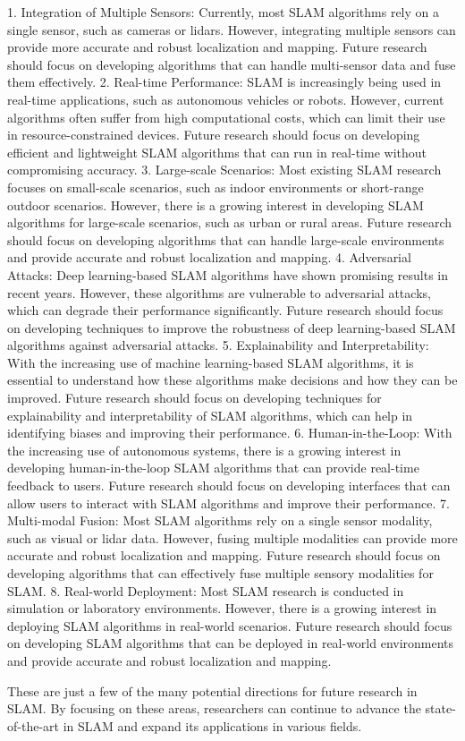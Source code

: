 \documentclass[conference]{IEEEtran}
\begin{document}
1. Integration of Multiple Sensors: Currently, most SLAM algorithms rely on a single sensor, such as cameras or lidars. However, integrating multiple sensors can provide more accurate and robust localization and mapping. Future research should focus on developing algorithms that can handle multi-sensor data and fuse them effectively.
2. Real-time Performance: SLAM is increasingly being used in real-time applications, such as autonomous vehicles or robots. However, current algorithms often suffer from high computational costs, which can limit their use in resource-constrained devices. Future research should focus on developing efficient and lightweight SLAM algorithms that can run in real-time without compromising accuracy.
3. Large-scale Scenarios: Most existing SLAM research focuses on small-scale scenarios, such as indoor environments or short-range outdoor scenarios. However, there is a growing interest in developing SLAM algorithms for large-scale scenarios, such as urban or rural areas. Future research should focus on developing algorithms that can handle large-scale environments and provide accurate and robust localization and mapping.
4. Adversarial Attacks: Deep learning-based SLAM algorithms have shown promising results in recent years. However, these algorithms are vulnerable to adversarial attacks, which can degrade their performance significantly. Future research should focus on developing techniques to improve the robustness of deep learning-based SLAM algorithms against adversarial attacks.
5. Explainability and Interpretability: With the increasing use of machine learning-based SLAM algorithms, it is essential to understand how these algorithms make decisions and how they can be improved. Future research should focus on developing techniques for explainability and interpretability of SLAM algorithms, which can help in identifying biases and improving their performance.
6. Human-in-the-Loop: With the increasing use of autonomous systems, there is a growing interest in developing human-in-the-loop SLAM algorithms that can provide real-time feedback to users. Future research should focus on developing interfaces that can allow users to interact with SLAM algorithms and improve their performance.
7. Multi-modal Fusion: Most SLAM algorithms rely on a single sensor modality, such as visual or lidar data. However, fusing multiple modalities can provide more accurate and robust localization and mapping. Future research should focus on developing algorithms that can effectively fuse multiple sensory modalities for SLAM.
8. Real-world Deployment: Most SLAM research is conducted in simulation or laboratory environments. However, there is a growing interest in deploying SLAM algorithms in real-world scenarios. Future research should focus on developing SLAM algorithms that can be deployed in real-world environments and provide accurate and robust localization and mapping.

These are just a few of the many potential directions for future research in SLAM. By focusing on these areas, researchers can continue to advance the state-of-the-art in SLAM and expand its applications in various fields.






\end{document}
